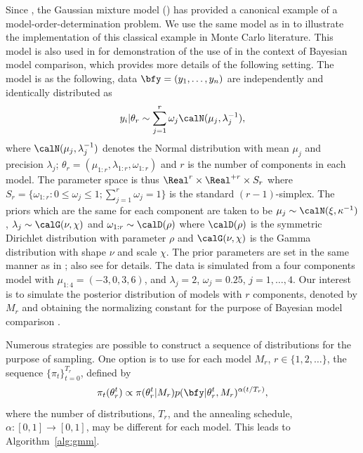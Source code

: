 \documentclass[11pt, fontset=Minion, showoverfull,
bib, biblatexstyle=numeric, mintcode, minted=cache]{marticle}
\begin{document}
Since \cite{Richardson:1997ea}, the Gaussian mixture model (\gmm) has provided
a canonical example of a model-order-determination problem. We use the same
model as in \cite{DelMoral:2006hc} to illustrate the implementation of this
classical example in Monte Carlo literature. This model is also used in
\cite{Zhou2013mc} for demonstration of the use of \smc in the context of
Bayesian model comparison, which provides more details of the following
setting. The model is as the following, data $\bfy = (y_1,\dots,y_n)$ are
independently and identically distributed as
\begin{equation*}
  y_i|\theta_r \sim \sum_{j=1}^r \omega_j\calN(\mu_j,\lambda_j^{-1}),
\end{equation*}
where $\calN(\mu_j,\lambda_j^{-1})$ denotes the Normal distribution with mean
$\mu_j$ and precision $\lambda_j$; $\theta_r =
(\mu_{1:r},\lambda_{1:r},\omega_{1:r})$ and $r$ is the number of components in
each model. The parameter space is thus $\Real^r\times\Real^{+r}\times S_r$
where $S_r = \{\omega_{1:r}:0\le\omega_j\le1; \sum_{j=1}^r\omega_j=1\}$ is the
standard $(r-1)$-simplex. The priors which are the same for each component are
taken to be $\mu_j\sim\calN(\xi,\kappa^{-1})$,
$\lambda_j\sim\calG(\nu,\chi)$ and $\omega_{1:r}\sim\calD(\rho)$ where
$\calD(\rho)$ is the symmetric Dirichlet distribution with parameter $\rho$
and $\calG(\nu,\chi)$ is the Gamma distribution with shape $\nu$ and scale
$\chi$. The prior parameters are set in the same manner as in
\cite{Richardson:1997ea}; also see \cite{Zhou2013mc} for details. The data
is simulated from a four components model with $\mu_{1:4} = (-3, 0,3, 6)$, and
$\lambda_j =2$, $\omega_j = 0.25$, $j = 1,\dots,4$. Our interest is to
simulate the posterior distribution of models with $r$ components, denoted by
$M_r$ and obtaining the normalizing constant for the purpose of Bayesian model
comparison \cite[chap.~7]{Robert:2007tc}.

Numerous strategies are possible to construct a sequence of distributions for
the purpose of \smc sampling. One option is to use for each model $M_r$,
$r\in\{1,2,\dots\}$, the sequence $\{\pi_t\}_{t=0}^{T_r}$, defined by
\begin{equation}
  \pi_t(\theta_r^t) \propto
  \pi(\theta_r^t|M_r)p(\bfy|\theta_r^t,M_r)^{\alpha(t/T_r)},
  \label{eq:geometry}
\end{equation}
where the number of distributions, $T_r$, and the annealing schedule,
$\alpha:[0,1]\to[0,1]$, may be different for each model. This leads to
Algorithm~\ref{alg:gmm}.
\end{document}
